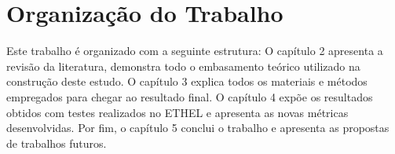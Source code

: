 \section{Organização do Trabalho}
Este trabalho é organizado com a seguinte estrutura: O capítulo 2 apresenta a revisão da literatura, demonstra todo o embasamento teórico utilizado na construção deste estudo. O capítulo 3 explica todos os materiais e métodos empregados para chegar ao resultado final. O capítulo 4 expõe os resultados obtidos com testes realizados no ETHEL e apresenta as novas métricas desenvolvidas. Por fim, o capítulo 5 conclui o trabalho e apresenta as propostas de trabalhos futuros.
